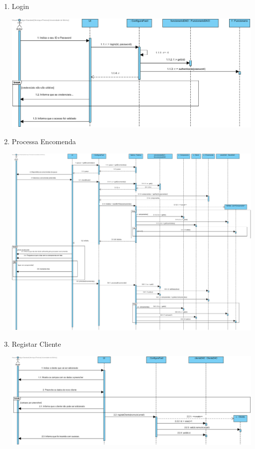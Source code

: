 \documentclass[11pt]{article} %
\begin{document}
\begin{enumerate}
\begin{center}
		\end{center}
	\item Login
		\begin{center}
 			\includegraphics[width = 6in]{dsi2_login.png}
		\end{center}
	\item Processa Encomenda
		\begin{center}
 			\includegraphics[width = 6in]{dsi2_processar_encomenda.png}
		\end{center}
	\item Registar Cliente
		\begin{center}
 			\includegraphics[width = 6in]{dsi2_registar_cliente.png}

\end{center}
\end{enumerate}
\end{document}
